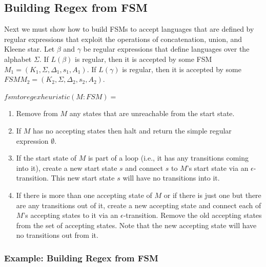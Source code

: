 \documentclass[hidelinks,12pt]{article}
\begin{document}
\subsection{Building Regex from FSM}

Next we must show how to build FSMs to accept languages that are defined by
regular expressions that exploit the operations of concatenation, union, and
Kleene star. Let $\beta$ and $\gamma$ be regular expressions that define
languages over the alphabet $\Sigma$. If $L(\beta)$ is regular, then it is
accepted by some FSM $M_1 = (K_1, \Sigma, \Delta_1, s_1, A_1)$. If $L(\gamma)$
is regular, then it is accepted by some $FSM M_2 = (K_2, \Sigma, \Delta_2, s_2,
A_2)$.

$fsmtoregexheuristic(M: FSM) =$
\begin{enumerate}
    \item Remove from $M$ any states that are unreachable from the start state.

    \item If $M$ has no accepting states then halt and return the simple
        regular expression $\emptyset$.

    \item If the start state of $M$ is part of a loop (i.e., it has any
        transitions coming into it), create a new start state $s$
        and connect $s$ to $M$’s start state via an
        $\epsilon$-transition. This new start state $s$ will have
        no transitions into it.

    \item If there is more than one accepting state of $M$ or if there is
        just one but there are any transitions out of it,
        create a new accepting state and connect each
        of $M$’s accepting states to it via an
        $\epsilon$-transition. Remove the old accepting states
        from the set of accepting states. Note that the
        new accepting state will have no transitions
        out from it.
\end{enumerate}

\subsubsection{Example: Building Regex from FSM}
\end{document}
